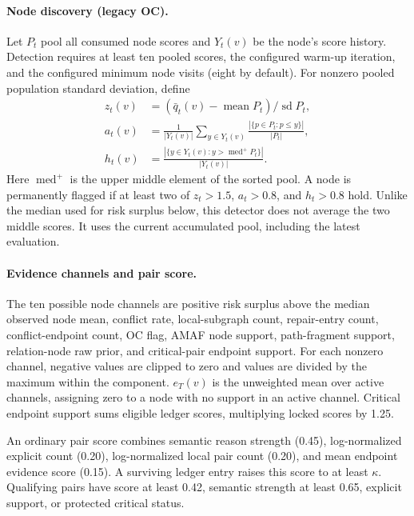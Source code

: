 \begin{revadded}
\paragraph{Node discovery (legacy OC).}
Let $P_t$ pool all consumed node scores and $Y_t(v)$ be the node's score history. Detection requires at least ten pooled scores, the configured warm-up iteration, and the configured minimum node visits (eight by default). For nonzero pooled population standard deviation, define
\begin{equation}
 \begin{aligned}
 z_t(v)&=(\bar q_t(v)-\operatorname{mean}P_t)/\operatorname{sd}P_t,\\
 a_t(v)&=\frac{1}{|Y_t(v)|}\sum_{y\in Y_t(v)}
       \frac{|\{p\in P_t:p\leq y\}|}{|P_t|},\\
 h_t(v)&=\frac{|\{y\in Y_t(v):y>\operatorname{med}^{+}P_t\}|}{|Y_t(v)|}.
 \end{aligned}
 \label{eq:oc-rule}
\end{equation}
Here $\operatorname{med}^{+}$ is the upper middle element of the sorted pool. A node is permanently flagged if at least two of $z_t>1.5$, $a_t>0.8$, and $h_t>0.8$ hold. Unlike the median used for risk surplus below, this detector does not average the two middle scores. It uses the current accumulated pool, including the latest evaluation.

\paragraph{Evidence channels and pair score.}
The ten possible node channels are positive risk surplus above the median observed node mean, conflict rate, local-subgraph count, repair-entry count, conflict-endpoint count, OC flag, AMAF node support, path-fragment support, relation-node raw prior, and critical-pair endpoint support. For each nonzero channel, negative values are clipped to zero and values are divided by the maximum within the component. $e_T(v)$ is the unweighted mean over active channels, assigning zero to a node with no support in an active channel. Critical endpoint support sums eligible ledger scores, multiplying locked scores by 1.25.

An ordinary pair score combines semantic reason strength (0.45), log-normalized explicit count (0.20), log-normalized local pair count (0.20), and mean endpoint evidence score (0.15). A surviving ledger entry raises this score to at least $\kappa$. Qualifying pairs have score at least 0.42, semantic strength at least 0.65, explicit support, or protected critical status.


\end{revadded}
